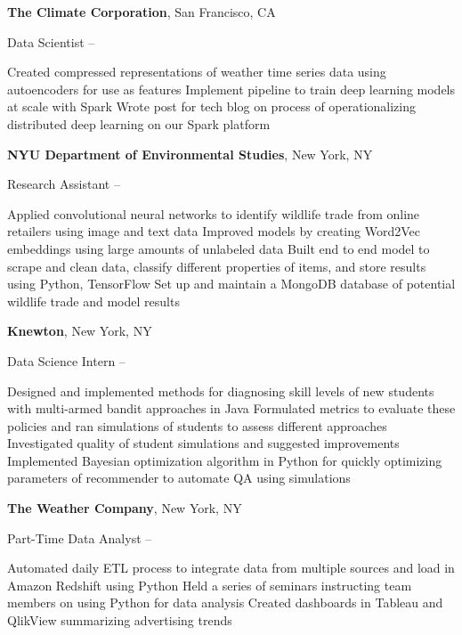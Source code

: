 \documentclass[letterpaper,9.5pt,oneside]{article}
\begin{document}
\begin{body}
\BigGap


\textbf{The Climate Corporation},
San Francisco, CA

\GapNoBreak
Data Scientist
\hfill
{} --
\begin{detail}
\BulletItem Created compressed representations of weather time series data using autoencoders for use as features
\BulletItem Implement pipeline to train deep learning models at scale with Spark
\BulletItem Wrote post for tech blog on process of operationalizing distributed deep learning on our Spark platform
\end{detail}

\BigGap

\textbf{NYU Department of Environmental Studies},
New York, NY

\GapNoBreak
Research Assistant
\hfill
{} --
\begin{detail}
\BulletItem Applied convolutional neural networks to identify wildlife trade from online retailers using image and text data
\BulletItem Improved models by creating Word2Vec embeddings using large amounts of unlabeled data
\BulletItem Built end to end model to scrape and clean data, classify different properties of items, and store results using Python, TensorFlow
\BulletItem Set up and maintain a MongoDB database of potential wildlife trade and model results
\end{detail}

\BigGap

\textbf{Knewton},
New York, NY

\GapNoBreak
Data Science Intern
\hfill
{} --
\begin{detail}
\BulletItem Designed and implemented methods for diagnosing skill levels of new students with multi-armed bandit approaches in Java
\BulletItem
Formulated metrics to evaluate these policies and ran simulations of students to assess different approaches
\BulletItem Investigated quality of student simulations and suggested improvements
\BulletItem Implemented Bayesian optimization algorithm in Python for quickly optimizing parameters of recommender to automate QA using simulations
\end{detail}

\BigGap

\textbf{The Weather Company},
New York, NY

\GapNoBreak
Part-Time Data Analyst
\hfill
{} --
\begin{detail}
\BulletItem
Automated daily ETL process to integrate data from multiple sources and load in Amazon Redshift using Python
\BulletItem Held a series of seminars instructing team members on using Python for data analysis
\BulletItem Created dashboards in Tableau and QlikView summarizing advertising trends
\end{detail}


\end{body}
\end{document}
